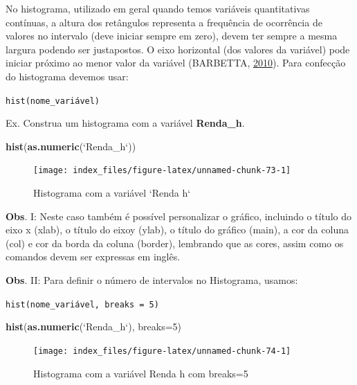 \documentclass[12pt,brazil,]{book}
\newenvironment{Shaded}{\begin{snugshade}}{\end{snugshade}}
\newcommand{\DataTypeTok}[1]{\textcolor[rgb]{0.13,0.29,0.53}{#1}}
\newcommand{\DecValTok}[1]{\textcolor[rgb]{0.00,0.00,0.81}{#1}}
\newcommand{\KeywordTok}[1]{\textcolor[rgb]{0.13,0.29,0.53}{\textbf{#1}}}
\newcommand{\NormalTok}[1]{#1}
\newcommand{\StringTok}[1]{\textcolor[rgb]{0.31,0.60,0.02}{#1}}
\begin{document}
No histograma, utilizado em geral quando temos variáveis quantitativas
contínuas, a altura dos retângulos representa a frequência de ocorrência
de valores no intervalo (deve iniciar sempre em zero), devem ter sempre
a mesma largura podendo ser justapostos. O eixo horizontal (dos valores
da variável) pode iniciar próximo ao menor valor da variável (BARBETTA,
\protect\hyperlink{ref-barbetta1988}{2010}). Para confecção do
histograma devemos usar:

\texttt{hist(nome\_variável)}

Ex. Construa um histograma com a variável \textbf{Renda\_h}.

\begin{Shaded}
\begin{Highlighting}[]
\KeywordTok{hist}\NormalTok{(}\KeywordTok{as.numeric}\NormalTok{(}\StringTok{`}\DataTypeTok{Renda_h}\StringTok{`}\NormalTok{))}
\end{Highlighting}
\end{Shaded}

\begin{figure}

{\centering \texttt{[image: index\_files/figure-latex/unnamed-chunk-73-1]} 

}

\caption{Histograma com a variável `Renda h`}\label{fig:unnamed-chunk-73}
\end{figure}

\textbf{Obs}. I: Neste caso também é possível personalizar o gráfico,
incluindo o título do eixo x (xlab), o título do eixoy (ylab), o título
do gráfico (main), a cor da coluna (col) e cor da borda da coluna
(border), lembrando que as cores, assim como os comandos devem ser
expressas em inglês.

\textbf{Obs}. II: Para definir o número de intervalos no Histograma,
usamos:

\texttt{hist(nome\_variável,\ breaks\ =\ 5)}

\begin{Shaded}
\begin{Highlighting}[]
\KeywordTok{hist}\NormalTok{(}\KeywordTok{as.numeric}\NormalTok{(}\StringTok{`}\DataTypeTok{Renda_h}\StringTok{`}\NormalTok{), }\DataTypeTok{breaks=}\DecValTok{5}\NormalTok{)}
\end{Highlighting}
\end{Shaded}

\begin{figure}

{\centering \texttt{[image: index\_files/figure-latex/unnamed-chunk-74-1]} 

}

\caption{Histograma com a variável Renda h com breaks=5}\label{fig:unnamed-chunk-74}
\end{figure}
\end{document}

